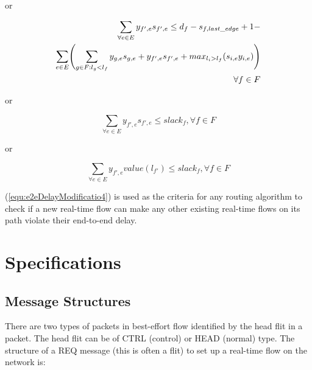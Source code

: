 \documentclass[conference, twocolumn]{IEEEtran}
\theoremstyle{definition}
\begin{document}
or

\begin{eqnarray}\label{equ:e2eDelayModificatio2}
\sum_{\forall e \in E}y_{f',e}s_{f',e} \leq d_f-s_{f,last\_edge} + 1 - \notag \\ 
\sum_{e \in E} \Biggl(\sum_{g \in F:l_g <
l_f}y_{g,e}s_{g,e}+y_{f',e}s_{f',e}+max_{l_i>l_f}(s_{i,e}y_{i,e})\Biggr) \notag
\\ \forall f \in F
\end{eqnarray}

or

\begin{equation}\label{equ:e2eDelayModificatio3}
\sum_{\forall e \in E}y_{f',e}s_{f',e} \leq slack_f, \forall f \in F
\end{equation}

or

\begin{equation}\label{equ:e2eDelayModificatio4}
\sum_{\forall e \in E}y_{f',e}value(l_{f'}) \leq slack_f, \forall f \in F
\end{equation}

(\ref{equ:e2eDelayModificatio4}) is used as the criteria for any routing
algorithm to check if a new real-time flow can make any other existing
real-time flows on its path violate their end-to-end delay.

\section{Specifications}
\subsection{Message Structures}

There are two types of packets in best-effort flow identified by the head flit
in a packet. The head flit can be of CTRL (control) or HEAD (normal) type. The
structure of a REQ message (this is often a flit) to set up a real-time flow on the network is:

\begin{table}[htbp]
\begin{center}
\end{center}
\caption{REQ path message}
\label{table:PathMsg}
\end{table}
\end{document}
